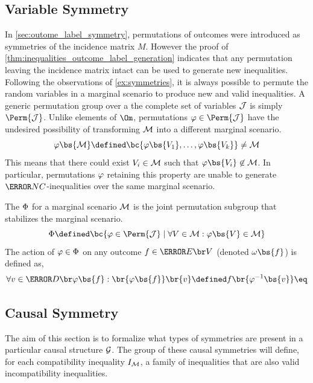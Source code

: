 \documentclass[aps, 10pt, english, twoside, pra, nofootinbib, longbibliography]{revtex4-1}
\begin{document}
    \subsection{Variable Symmetry}

    In \cref{sec:outome_label_symmetry}, permutations of outcomes were introduced as symmetries of the incidence matrix $M$. However the proof of \cref{thm:inequalities_outcome_label_generation} indicates that any permutation leaving the incidence matrix intact can be used to generate new inequalities. \\

    Following the observations of \cref{ex:symmetries}, it is always possible to permute the random variables in a marginal scenario to produce new and valid inequalities. A generic permutation group over a the complete set of variables $\mathcal{J}$ is simply $\Perm{\jointvar}$. Unlike elements of $\Om$, permutations $\gep \in \Perm{\jointvar}$ have the undesired possibility of transforming $\mathcal{M}$ into a different marginal scenario.
    \[ \gep\bs{\mscenario} \defined \bc{\gep\bs{V_1}, \ldots, \gep\bs{V_k}} \neq \mscenario \]
    This means that there could exist $V_i \in \mathcal{M}$ such that $\gep\bs{V_i} \not \in \mscenario$. In particular, permutations $\varphi$ retaining this property are unable to generate $\s{NC}$-inequalities over the same marginal scenario.

    \begin{definition}
        The  $\Phi$ for a marginal scenario $\mathcal{M}$ is the joint permutation subgroup that stabilizes the marginal scenario.
        \[ \Phi \defined \bc{\gep \in \Perm{\jointvar} \mid \forall V \in \mscenario : \gep\bs{V} \in \mscenario} \]
        The action of $\varphi \in \Phi$ on any outcome $f \in \Events{V}$ (denoted $\geo\bs{f}$) is defined as,
        \[ \forall v \in \Dom{\gep\bs{f}} : \br{\gep\bs{f}}\br{v} \defined f\br{\gep^{-1}\bs{v}} \eq \label{eq:act_on_variable}\]
    \end{definition}


    \subsection{Causal Symmetry}

    The aim of this section is to formalize what types of symmetries are present in a particular causal structure $\mathcal{G}$. The group of these causal symmetries will define, for each compatibility inequality $I_{\mathcal{M}}$, a family of inequalities that are also valid incompatibility inequalities.
\end{document}
